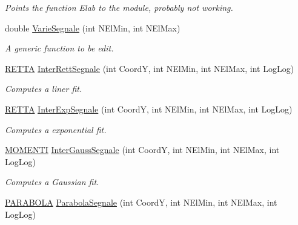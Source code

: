 \begin{DoxyCompactItemize}
\begin{DoxyCompactList}\small\item\em Points the function Elab to the module, probably not working. \end{DoxyCompactList}\item 
double \hyperlink{classVarDatFile_aa8c3dec822e735ee8835f0e19d8b15a3}{Varie\+Segnale} (int N\+El\+Min, int N\+El\+Max)\hypertarget{classVarDatFile_aa8c3dec822e735ee8835f0e19d8b15a3}{}\label{classVarDatFile_aa8c3dec822e735ee8835f0e19d8b15a3}

\begin{DoxyCompactList}\small\item\em A generic function to be edit. \end{DoxyCompactList}\item 
\hyperlink{structRETTA}{R\+E\+T\+TA} \hyperlink{classVarDatFile_ad705e28f47a98707e3dd3c83d86e85b3}{Inter\+Rett\+Segnale} (int CoordY, int N\+El\+Min, int N\+El\+Max, int Log\+Log)\hypertarget{classVarDatFile_ad705e28f47a98707e3dd3c83d86e85b3}{}\label{classVarDatFile_ad705e28f47a98707e3dd3c83d86e85b3}

\begin{DoxyCompactList}\small\item\em Computes a liner fit. \end{DoxyCompactList}\item 
\hyperlink{structRETTA}{R\+E\+T\+TA} \hyperlink{classVarDatFile_a7e8033bdeb05d587eb6ce7dedf3ffe8b}{Inter\+Exp\+Segnale} (int CoordY, int N\+El\+Min, int N\+El\+Max, int Log\+Log)\hypertarget{classVarDatFile_a7e8033bdeb05d587eb6ce7dedf3ffe8b}{}\label{classVarDatFile_a7e8033bdeb05d587eb6ce7dedf3ffe8b}

\begin{DoxyCompactList}\small\item\em Computes a exponential fit. \end{DoxyCompactList}\item 
\hyperlink{structMOMENTI}{M\+O\+M\+E\+N\+TI} \hyperlink{classVarDatFile_a77d32f56ea66cb8070e708766c7577ea}{Inter\+Gauss\+Segnale} (int CoordY, int N\+El\+Min, int N\+El\+Max, int Log\+Log)\hypertarget{classVarDatFile_a77d32f56ea66cb8070e708766c7577ea}{}\label{classVarDatFile_a77d32f56ea66cb8070e708766c7577ea}

\begin{DoxyCompactList}\small\item\em Computes a Gaussian fit. \end{DoxyCompactList}\item 
\hyperlink{structPARABOLA}{P\+A\+R\+A\+B\+O\+LA} \hyperlink{classVarDatFile_a670b0120b56b71deeb92a07dbc2d1a93}{Parabola\+Segnale} (int CoordY, int N\+El\+Min, int N\+El\+Max, int Log\+Log)\hypertarget{classVarDatFile_a670b0120b56b71deeb92a07dbc2d1a93}{}\label{classVarDatFile_a670b0120b56b71deeb92a07dbc2d1a93}


\end{DoxyCompactItemize}
